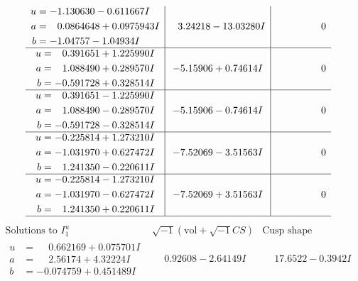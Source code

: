 \documentclass[1p]{elsarticle_modified}
\theoremstyle{definition}
\newcommand{\I}{\sqrt{-1}}
\begin{document}
$$\begin{array}{c|c|c}
\begin{aligned}
u &= -1.130630 - 0.611667 I \\
a &= \phantom{-}0.0864648 + 0.0975943 I \\
b &= -1.04757 - 1.04934 I\end{aligned}
 & \phantom{-}3.24218 - 13.03280 I & \phantom{-0.000000 } 0 \\ \hline\begin{aligned}
u &= \phantom{-}0.391651 + 1.225990 I \\
a &= \phantom{-}1.088490 + 0.289570 I \\
b &= -0.591728 + 0.328514 I\end{aligned}
 & -5.15906 + 0.74614 I & \phantom{-0.000000 } 0 \\ \hline\begin{aligned}
u &= \phantom{-}0.391651 - 1.225990 I \\
a &= \phantom{-}1.088490 - 0.289570 I \\
b &= -0.591728 - 0.328514 I\end{aligned}
 & -5.15906 - 0.74614 I & \phantom{-0.000000 } 0 \\ \hline\begin{aligned}
u &= -0.225814 + 1.273210 I \\
a &= -1.031970 + 0.627472 I \\
b &= \phantom{-}1.241350 - 0.220611 I\end{aligned}
 & -7.52069 - 3.51563 I & \phantom{-0.000000 } 0 \\ \hline\begin{aligned}
u &= -0.225814 - 1.273210 I \\
a &= -1.031970 - 0.627472 I \\
b &= \phantom{-}1.241350 + 0.220611 I\end{aligned}
 & -7.52069 + 3.51563 I & \phantom{-0.000000 } 0\\
 \hline 
 \end{array}$$\newpage$$\begin{array}{c|c|c}  
\text{Solutions to }I^u_{1}& \I (\text{vol} + \sqrt{-1}CS) & \text{Cusp shape}\\
 \hline 
\begin{aligned}
u &= \phantom{-}0.662169 + 0.075701 I \\
a &= \phantom{-}2.56174 + 4.32224 I \\
b &= -0.074759 + 0.451489 I\end{aligned}
 & \phantom{-}0.92608 - 2.64149 I & \phantom{-}17.6522 - 0.3942 I \\ \hline\begin{aligned}

\end{aligned}
\end{array}$$
\end{document}
